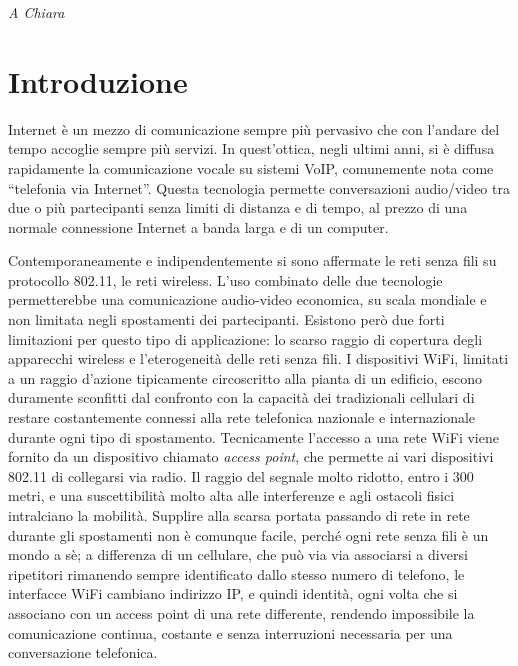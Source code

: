 \documentclass[12pt,a4paper,openright,twoside]{book}
\begin{document}
%
%
\begin{titlepage}
  \thispagestyle{empty}
  \topmargin=6.5cm
  \raggedleft
  \large \em A Chiara
  \newpage
  \clearpage{\pagestyle{empty}\cleardoublepage}
\end{titlepage}



\chapter*{Introduzione}

Internet è un mezzo di comunicazione sempre più pervasivo che con
l'andare del tempo accoglie sempre più servizi. In quest'ottica, negli
ultimi anni, si è diffusa rapidamente la comunicazione vocale su
sistemi VoIP, comunemente nota come ``telefonia via Internet''. Questa
tecnologia permette conversazioni audio/video tra due o più
partecipanti senza limiti di distanza e di tempo, al prezzo di una
normale connessione Internet a banda larga e di un computer.

Contemporaneamente e indipendentemente si sono affermate le reti senza
fili su protocollo 802.11, le reti wireless. L'uso combinato delle due
tecnologie permetterebbe una comunicazione audio-video economica, su
scala mondiale e non limitata negli spostamenti dei
partecipanti. Esistono però due forti limitazioni per questo tipo di
applicazione: lo scarso raggio di copertura degli apparecchi wireless
e l'eterogeneità delle reti senza fili. I dispositivi WiFi, limitati a
un raggio d'azione tipicamente circoscritto alla pianta di un
edificio, escono duramente sconfitti dal confronto con la capacità dei
tradizionali cellulari di restare costantemente connessi alla rete
telefonica nazionale e internazionale durante ogni tipo di
spostamento. Tecnicamente l'accesso a una rete WiFi viene fornito da
un dispositivo chiamato \emph{access point}, che permette ai vari
dispositivi 802.11 di collegarsi via radio. Il raggio del segnale
molto ridotto, entro i 300 metri, e una suscettibilità molto alta alle
interferenze e agli ostacoli fisici intralciano la mobilità. Supplire
alla scarsa portata passando di rete in rete durante gli spostamenti
non è comunque facile, perché ogni rete senza fili è un mondo a sè; a
differenza di un cellulare, che può via via associarsi a diversi
ripetitori rimanendo sempre identificato dallo stesso numero di
telefono, le interfacce WiFi cambiano indirizzo IP, e quindi identità,
ogni volta che si associano con un access point di una rete
differente, rendendo impossibile la comunicazione continua, costante e
senza interruzioni necessaria per una conversazione telefonica.
\end{document}
